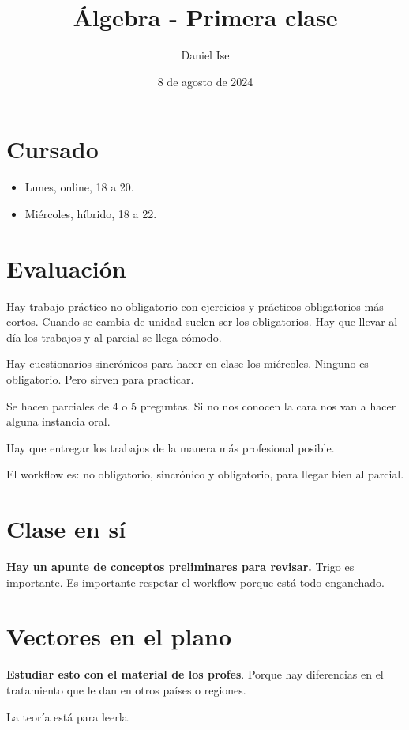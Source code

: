 \documentclass{article}
\title{Álgebra - Primera clase}
\author{Daniel Ise}
\date{8 de agosto de 2024}
\begin{document}
\maketitle

\section*{Cursado}

\begin{itemize}
    \item Lunes, online, 18 a 20.
    \item Miércoles, híbrido, 18 a 22.
\end{itemize}

\section*{Evaluación}

Hay trabajo práctico no obligatorio con ejercicios y prácticos obligatorios más cortos.
Cuando se cambia de unidad suelen ser los obligatorios. Hay que llevar al día los
trabajos y al parcial se llega cómodo.

Hay cuestionarios sincrónicos para hacer en clase los miércoles. Ninguno es obligatorio.
Pero sirven para practicar.

Se hacen parciales de 4 o 5 preguntas. Si no nos conocen la cara nos van a hacer
alguna instancia oral.

Hay que entregar los trabajos de la manera más profesional posible.

El workflow es: no obligatorio, sincrónico y obligatorio, para llegar bien al parcial.

\section*{Clase en sí}

\textbf{Hay un apunte de conceptos preliminares para revisar.} Trigo es importante.
Es importante respetar el workflow porque está todo enganchado.

\section*{Vectores en el plano}

\textbf{Estudiar esto con el material de los profes}. Porque hay diferencias en el
tratamiento que le dan en otros países o regiones.

La teoría está para leerla.
\end{document}
